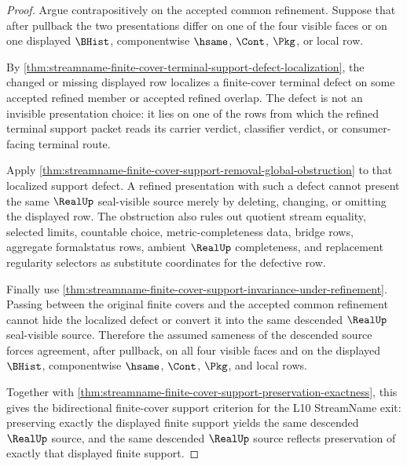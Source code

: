\begin{proof}
Argue contrapositively on the accepted common refinement. Suppose that after
pullback the two presentations differ on one of the four visible faces or on
one displayed $\BHist$, componentwise $\hsame$, $\Cont$, $\Pkg$, or local
\NameCert{} row.

By
\autoref{thm:streamname-finite-cover-terminal-support-defect-localization},
the changed or missing displayed row localizes a finite-cover terminal defect
on some accepted refined member or accepted refined overlap. The defect is
not an invisible presentation choice: it lies on one of the rows from which
the refined terminal support packet reads its carrier verdict, classifier
verdict, or consumer-facing terminal route.

Apply
\autoref{thm:streamname-finite-cover-support-removal-global-obstruction} to
that localized support defect. A refined presentation with such a defect
cannot present the same $\RealUp$ seal-visible source merely by deleting,
changing, or omitting the displayed row. The obstruction also rules out
quotient stream equality, selected limits, countable choice,
metric-completeness data, bridge rows, aggregate formalstatus rows, ambient
$\RealUp$ completeness, and replacement regularity selectors as substitute
coordinates for the defective row.

Finally use
\autoref{thm:streamname-finite-cover-support-invariance-under-refinement}.
Passing between the original finite covers and the accepted common refinement
cannot hide the localized defect or convert it into the same descended
$\RealUp$ seal-visible source. Therefore the assumed sameness of the
descended source forces agreement, after pullback, on all four visible faces
and on the displayed $\BHist$, componentwise $\hsame$, $\Cont$, $\Pkg$, and
local \NameCert{} rows.

Together with
\autoref{thm:streamname-finite-cover-support-preservation-exactness}, this
gives the bidirectional finite-cover support criterion for the L10
StreamName exit: preserving exactly the displayed finite support yields the
same descended $\RealUp$ source, and the same descended $\RealUp$ source
reflects preservation of exactly that displayed finite support.
\end{proof}

